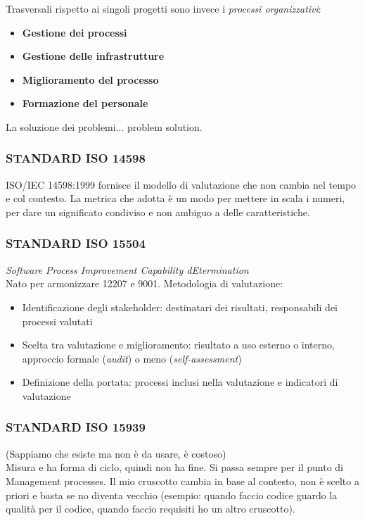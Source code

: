 			Trasversali rispetto ai singoli progetti sono invece i \textit{processi organizzativi}:
				\begin{itemize}
					\item \textbf{Gestione dei processi}
					\item \textbf{Gestione delle infrastrutture}
					\item \textbf{Miglioramento del processo}
					\item \textbf{Formazione del personale}
				\end{itemize}

			La soluzione dei problemi... problem solution.	%


			\subsubsection{STANDARD ISO 14598}		\label{14596}
			ISO/IEC 14598:1999 fornisce il modello di valutazione che non cambia nel tempo e col contesto. La metrica che adotta è un modo per mettere in scala i numeri, per dare un significato condiviso e non ambiguo a delle caratteristiche.


			\subsubsection{STANDARD ISO 15504}		\label{15504}
			\textit{Software Process Improvement Capability dEtermination} \\
			Nato per armonizzare 12207 e 9001. Metodologia di valutazione:
			\begin{itemize}
				\item Identificazione degli stakeholder: destinatari dei risultati, responsabili dei processi valutati
				\item Scelta tra valutazione e miglioramento: risultato a uso esterno o interno, approccio formale (\textit{audit}) o meno (\textit{self-assessment})
				\item Definizione della portata: processi inclusi nella valutazione e indicatori di valutazione
			\end{itemize}


			\subsubsection{STANDARD ISO 15939}		%
			(Sappiamo che esiste ma non è da usare, è costoso) \\
			Misura e ha forma di ciclo, quindi non ha fine. Si passa sempre per il punto di Management processes. Il mio cruscotto cambia in base al contesto, non è scelto a priori e basta se no diventa vecchio (esempio: quando faccio codice guardo la qualità per il codice, quando faccio requisiti ho un altro cruscotto).


